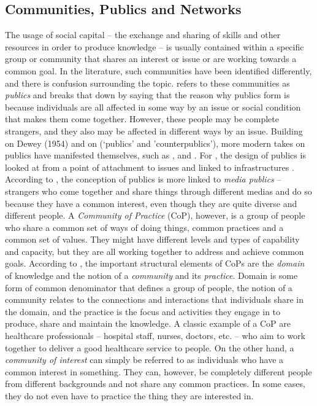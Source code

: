 \subsection{Communities, Publics and Networks}
\label{sub:com_net}
The usage of social capital -- the exchange and sharing of skills and other resources in order to produce knowledge \citet{coleman_social_1988} -- is usually contained within a specific group or community that shares an interest or issue or are working towards a common goal. In the literature, such communities have been identified differently, and there is confusion surrounding the topic. \citet[Orig. 1927]{dewey_public_1954} refers to these communities as \textit{publics} and breaks that down by saying that the reason why publics form is because individuals are all affected in some way by an issue or social condition that makes them come together. However, these people may be complete strangers, and they also may be affected in different ways by an issue. Building on Dewey (1954) and on \citet{warner_publics_2005} (`publics' and 'counterpublics'), more modern takes on publics have manifested themselves, such as \citet{mccarthy_taking_2015}, and \citet{le_dantec_designing_2016}. For \citet{le_dantec_designing_2016}, the design of publics is looked at from a point of attachment to issues and linked to infrastructures \citep[ch. 2]{le_dantec_designing_2016}. According to \citet{mccarthy_taking_2015}, the conception of publics is more linked to \textit{media publics} -- strangers who come together and share things through different medias and do so because they have a common interest, even though they are quite diverse and different people. A \textit{Community of Practice} (CoP), however, is a group of people who share a common set of ways of doing things, common practices and a common set of values. They might have different levels and types of capability and capacity, but they are all working together to address and achieve common goals. According to \citet{lave_situated_1991}, the important structural elements of CoPs are the \textit{domain} of knowledge and the notion of a \textit{community} and its \textit{practice}. Domain is some form of common denominator that defines a group of people, the notion of a community relates to the connections and interactions that individuals share in the domain, and the practice is the focus and activities they engage in to produce, share and maintain the knowledge. A classic example of a CoP are healthcare professionals -- hospital staff, nurses, doctors, etc. -- who aim to work together to deliver a good healthcare service to people. On the other hand, a \textit{community of interest} can simply be referred to as individuals who have a common interest in something. They can, however, be completely different people from different backgrounds and not share any common practices. In some cases, they do not even have to practice the thing they are interested in.

